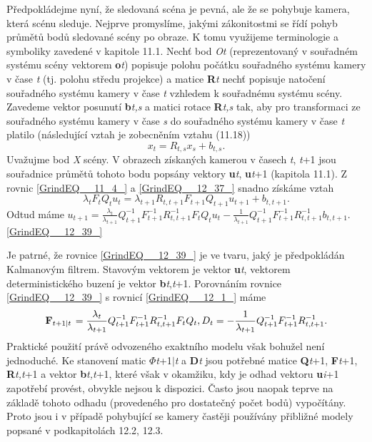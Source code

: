 \noindent Předpokládejme nyní, že sledovaná scéna je pevná, ale že se pohybuje kamera, která scénu sleduje. Nejprve promyslíme, jakými zákonitostmi se řídí pohyb průmětů bodů sledované scény po obraze. K tomu využijeme terminologie a symboliky zavedené v kapitole 11.1. Nechť bod \textit{Ot} (reprezentovaný v souřadném systému scény vektorem \textbf{o}\textit{t}) popisuje polohu počátku souřadného systému kamery v čase \textit{t} (tj. polohu středu projekce) a matice \textbf{R}\textit{t} nechť popisuje natočení souřadného systému kamery v čase \textit{t} vzhledem k souřadnému systému scény. Zavedeme vektor posunutí \textbf{b}\textit{t,s} a matici rotace \textbf{R}\textit{t,s} tak, aby pro transformaci ze souřadného systému kamery v čase \textit{s} do souřadného systému kamery v čase \textit{t} platilo (následující vztah je zobecněním vztahu (11.18))
\begin{equation} \label{GrindEQ__12_37_} 
x_{t} =R_{t,s} x_{s} +b_{t,s} .  
\end{equation} 
Uvažujme bod \textit{X} scény. V obrazech získaných kamerou v časech \textit{t}, \textit{t}+1 jsou souřadnice průmětů tohoto bodu popsány vektory \textbf{u}\textit{t}, \textbf{u}\textit{t}+1 (kapitola 11.1). Z rovnic \eqref{GrindEQ__11_4_} a \eqref{GrindEQ__12_37_} snadno získáme vztah
\begin{equation} \label{GrindEQ__12_38_} 
\lambda _{t} F_{t} Q_{t} u_{t} =\lambda _{t+1} R_{t,t+1} F_{t+1} Q_{t+1} u_{t+1} +b_{t,t+1} .  
\end{equation} 
Odtud máme $u_{t+1} =\frac{\lambda _{t} }{\lambda _{t+1} } Q_{t+1}^{-1} F_{t+1}^{-1} R_{t,t+1}^{-1} F_{t} Q_{t} u_{t} -\frac{1}{\lambda _{t+1} } Q_{t+1}^{-1} F_{t+1}^{-1} R_{t,t+1}^{-1} b_{t,t+1} $. \eqref{GrindEQ__12_39_}

\noindent Je patrné, že rovnice \eqref{GrindEQ__12_39_} je ve tvaru, jaký je předpokládán Kalmanovým filtrem. Stavovým vektorem je vektor \textbf{u}\textit{t}, vektorem deterministického buzení je vektor \textbf{b}\textit{t},\textit{t}+1. Porovnáním rovnice \eqref{GrindEQ__12_39_} s rovnicí \eqref{GrindEQ__12_1_} máme
\begin{equation} \label{GrindEQ__12_40_} 
{\bf F}_{t+1\left|t\right. } =\frac{\lambda _{t} }{\lambda _{t+1} } Q_{t+1}^{-1} F_{t+1}^{-1} R_{t,t+1}^{-1} F_{t} Q_{t} ,     D_{t} =-\frac{1}{\lambda _{t+1} } Q_{t+1}^{-1} F_{t+1}^{-1} R_{t,t+1}^{-1} .  
\end{equation} 
Praktické použití právě odvozeného exaktního modelu však bohužel není jednoduché. Ke stanovení matic \textbf{$\Phi$}\textit{t}+1$\mid$\textit{t} a \textbf{D}\textit{t} jsou potřebné matice \textbf{Q}\textit{t}+1, \textbf{F}\textit{t}+1, \textbf{R}\textit{t,t}+1 a vektor \textbf{b}\textit{t,t}+1, které však v okamžiku, kdy je odhad vektoru \textbf{u}\textit{i}+1 zapotřebí provést, obvykle nejsou k dispozici. Často jsou naopak teprve na základě tohoto odhadu (provedeného pro dostatečný počet bodů) vypočítány. Proto jsou i v případě pohybující se kamery častěji používány přibližné modely popsané v podkapitolách 12.2, 12.3.

